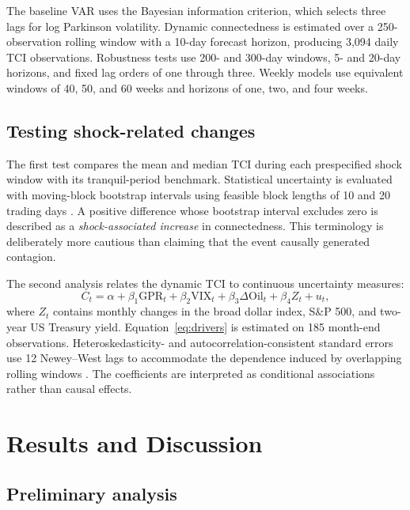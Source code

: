 \documentclass[12pt,a4paper]{article}
\begin{document}
The baseline VAR uses the Bayesian information criterion, which selects three lags for log Parkinson volatility. Dynamic connectedness is estimated over a 250-observation rolling window with a 10-day forecast horizon, producing 3,094 daily TCI observations. Robustness tests use 200- and 300-day windows, 5- and 20-day horizons, and fixed lag orders of one through three. Weekly models use equivalent windows of 40, 50, and 60 weeks and horizons of one, two, and four weeks.

\subsection{Testing shock-related changes}

The first test compares the mean and median TCI during each prespecified shock window with its tranquil-period benchmark. Statistical uncertainty is evaluated with moving-block bootstrap intervals using feasible block lengths of 10 and 20 trading days \citep{Kunsch1989}. A positive difference whose bootstrap interval excludes zero is described as a \emph{shock-associated increase} in connectedness. This terminology is deliberately more cautious than claiming that the event causally generated contagion.

The second analysis relates the dynamic TCI to continuous uncertainty measures:
\begin{equation}
 C_t=\alpha+\beta_1\mathrm{GPR}_t+\beta_2\mathrm{VIX}_t
 +\beta_3\Delta\mathrm{Oil}_t+\beta_4 Z_t+u_t,
 \label{eq:drivers}
\end{equation}
where $Z_t$ contains monthly changes in the broad dollar index, S\&P 500, and two-year US Treasury yield. Equation~\eqref{eq:drivers} is estimated on 185 month-end observations. Heteroskedasticity- and autocorrelation-consistent standard errors use 12 Newey--West lags to accommodate the dependence induced by overlapping rolling windows \citep{NeweyWest1987}. The coefficients are interpreted as conditional associations rather than causal effects.

\section{Results and Discussion}
\label{sec:results}

\subsection{Preliminary analysis}
\end{document}
